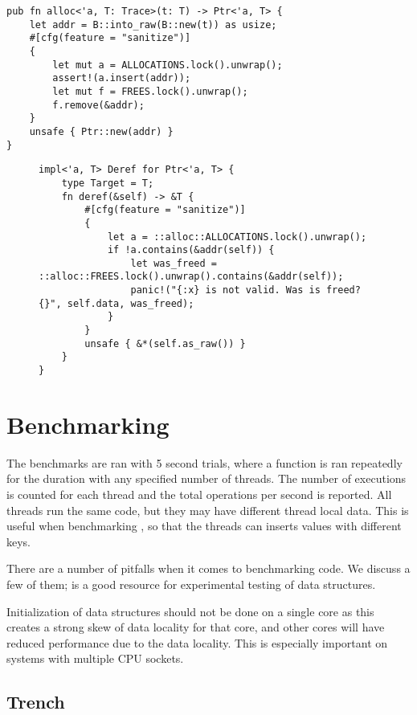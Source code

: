 \begin{lstlisting}
pub fn alloc<'a, T: Trace>(t: T) -> Ptr<'a, T> {
    let addr = B::into_raw(B::new(t)) as usize;
    #[cfg(feature = "sanitize")]
    {
        let mut a = ALLOCATIONS.lock().unwrap();
        assert!(a.insert(addr));
        let mut f = FREES.lock().unwrap();
        f.remove(&addr);
    }
    unsafe { Ptr::new(addr) }
}
\end{lstlisting}

\begin{figure}[ht]
\begin{lstlisting}[label=lst:ptr-sanitize,caption=Verifying all pointer accesses with
\code{sanitize}]
impl<'a, T> Deref for Ptr<'a, T> {
    type Target = T;
    fn deref(&self) -> &T {
        #[cfg(feature = "sanitize")]
        {
            let a = ::alloc::ALLOCATIONS.lock().unwrap();
            if !a.contains(&addr(self)) {
                let was_freed = ::alloc::FREES.lock().unwrap().contains(&addr(self));
                panic!("{:x} is not valid. Was is freed? {}", self.data, was_freed);
            }
        }
        unsafe { &*(self.as_raw()) }
    }
}
\end{lstlisting}
\end{figure}

\section{Benchmarking}

The benchmarks are ran with 5 second trials, where a function is ran repeatedly for the duration
with any specified number of threads. The number of executions is counted for each thread and
the total operations per second is reported. All threads run the same code, but they may have
different thread local data. This is useful when benchmarking , so that the
threads can inserts values with different keys.

There are a number of pitfalls when it comes to benchmarking code. We discuss a few of them;
\cite{rare} is a good resource for experimental testing of data structures.

Initialization of data structures should not be done on a single core as this creates
a strong skew of data locality for that core, and other cores will have reduced performance due to
the data locality. This is especially important on systems with multiple CPU sockets.




\subsection{Trench}


